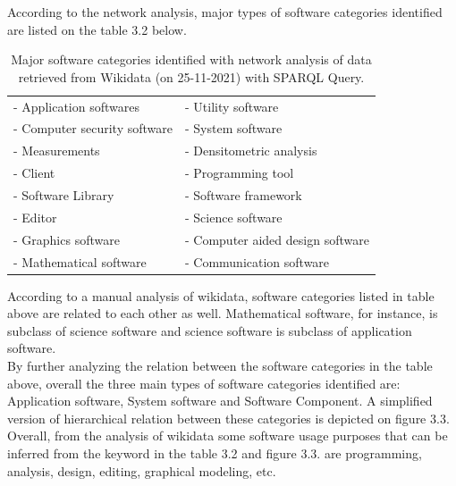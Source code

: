 \noindent According to the network analysis, major types of software categories identified are listed on the table 3.2 below.
\\
\begin{table}[h!]
	\begin{center}
		\caption{Major software categories identified with network analysis of data retrieved from Wikidata (on 25-11-2021) with \ac{SPARQL} Query.}
		\label{tab:table1}
		\begin{tabular}{|l|l|} %
			
			\hline
			- Application softwares & -	Utility software  \\
			- Computer security software & - System software \\
			- Measurements   & - Densitometric analysis \\
			- Client       & - Programming tool   \\
			- Software Library        & - Software framework  \\
			- Editor  & - Science software     \\
			- Graphics software     & - Computer aided design software \\
			- Mathematical software          & - Communication software \\
			\hline
		\end{tabular}
	\end{center}
\end{table}

According to a manual analysis of wikidata, software categories listed  in table above are related to each other as well. Mathematical software, for instance, is subclass of science software and science software is subclass of application software. \\

By further analyzing the relation between the software categories in the table above, overall the three main types of software categories identified are:  Application software, System software and Software Component. A simplified version of  hierarchical relation between these categories is depicted on figure 3.3. Overall, from the analysis of wikidata some software usage purposes that can be inferred from the keyword in the table 3.2 and figure 3.3. are programming, analysis, design, editing, graphical modeling, etc. 

